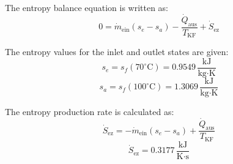 The entropy balance equation is written as:  
\[
0 = \dot{m}_{\text{ein}} (s_e - s_a) - \frac{\dot{Q}_{\text{aus}}}{T_{\text{KF}}} + \dot{S}_{\text{ez}}
\]

The entropy values for the inlet and outlet states are given:  
\[
s_e = s_f(70^\circ\text{C}) = 0.9549 \, \frac{\text{kJ}}{\text{kg·K}}
\]  
\[
s_a = s_f(100^\circ\text{C}) = 1.3069 \, \frac{\text{kJ}}{\text{kg·K}}
\]

The entropy production rate is calculated as:  
\[
\dot{S}_{\text{ez}} = -\dot{m}_{\text{ein}} (s_e - s_a) + \frac{\dot{Q}_{\text{aus}}}{T_{\text{KF}}}
\]  
\[
\dot{S}_{\text{ez}} = 0.3177 \, \frac{\text{kJ}}{\text{K·s}}
\]